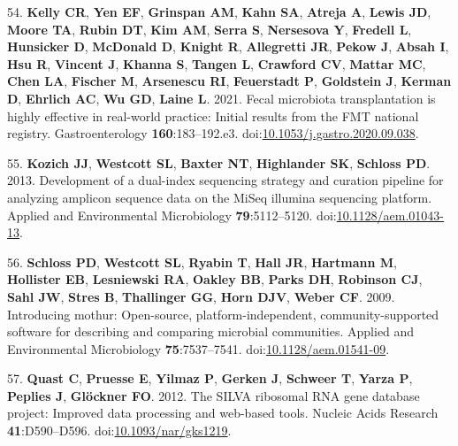 \documentclass[
  11pt,
]{article}
\begin{document}
\leavevmode\hypertarget{ref-Kelly2021}{}%
54. \textbf{Kelly CR}, \textbf{Yen EF}, \textbf{Grinspan AM},
\textbf{Kahn SA}, \textbf{Atreja A}, \textbf{Lewis JD}, \textbf{Moore
TA}, \textbf{Rubin DT}, \textbf{Kim AM}, \textbf{Serra S},
\textbf{Nersesova Y}, \textbf{Fredell L}, \textbf{Hunsicker D},
\textbf{McDonald D}, \textbf{Knight R}, \textbf{Allegretti JR},
\textbf{Pekow J}, \textbf{Absah I}, \textbf{Hsu R}, \textbf{Vincent J},
\textbf{Khanna S}, \textbf{Tangen L}, \textbf{Crawford CV},
\textbf{Mattar MC}, \textbf{Chen LA}, \textbf{Fischer M},
\textbf{Arsenescu RI}, \textbf{Feuerstadt P}, \textbf{Goldstein J},
\textbf{Kerman D}, \textbf{Ehrlich AC}, \textbf{Wu GD}, \textbf{Laine
L}. 2021. Fecal microbiota transplantation is highly effective in
real-world practice: Initial results from the FMT national registry.
Gastroenterology \textbf{160}:183--192.e3.
doi:\href{https://doi.org/10.1053/j.gastro.2020.09.038}{10.1053/j.gastro.2020.09.038}.

\leavevmode\hypertarget{ref-Kozich2013}{}%
55. \textbf{Kozich JJ}, \textbf{Westcott SL}, \textbf{Baxter NT},
\textbf{Highlander SK}, \textbf{Schloss PD}. 2013. Development of a
dual-index sequencing strategy and curation pipeline for analyzing
amplicon sequence data on the MiSeq illumina sequencing platform.
Applied and Environmental Microbiology \textbf{79}:5112--5120.
doi:\href{https://doi.org/10.1128/aem.01043-13}{10.1128/aem.01043-13}.

\leavevmode\hypertarget{ref-Schloss2009}{}%
56. \textbf{Schloss PD}, \textbf{Westcott SL}, \textbf{Ryabin T},
\textbf{Hall JR}, \textbf{Hartmann M}, \textbf{Hollister EB},
\textbf{Lesniewski RA}, \textbf{Oakley BB}, \textbf{Parks DH},
\textbf{Robinson CJ}, \textbf{Sahl JW}, \textbf{Stres B},
\textbf{Thallinger GG}, \textbf{Horn DJV}, \textbf{Weber CF}. 2009.
Introducing mothur: Open-source, platform-independent,
community-supported software for describing and comparing microbial
communities. Applied and Environmental Microbiology
\textbf{75}:7537--7541.
doi:\href{https://doi.org/10.1128/aem.01541-09}{10.1128/aem.01541-09}.

\leavevmode\hypertarget{ref-Quast2012}{}%
57. \textbf{Quast C}, \textbf{Pruesse E}, \textbf{Yilmaz P},
\textbf{Gerken J}, \textbf{Schweer T}, \textbf{Yarza P}, \textbf{Peplies
J}, \textbf{Glöckner FO}. 2012. The SILVA ribosomal RNA gene database
project: Improved data processing and web-based tools. Nucleic Acids
Research \textbf{41}:D590--D596.
doi:\href{https://doi.org/10.1093/nar/gks1219}{10.1093/nar/gks1219}.
\end{document}
